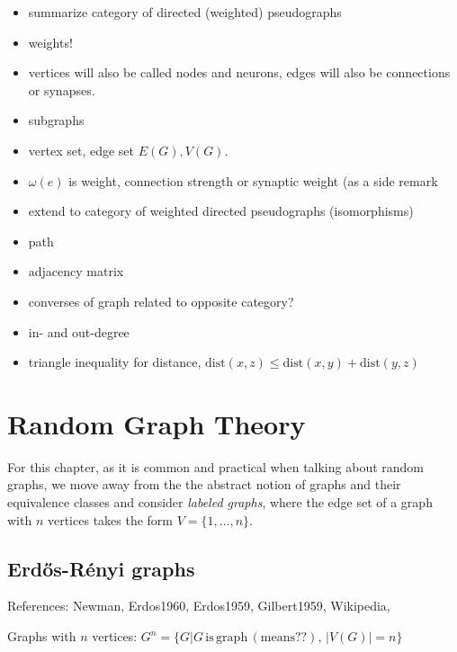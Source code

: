\begin{itemize}
\item summarize category of directed (weighted) pseudographs
\item weights!
\item vertices will also be called nodes and neurons, edges will also
  be connections or synapses.
\item subgraphs
\item vertex set, edge set $E(G), V(G)$.
\item $\omega(e)$ is weight, connection strength or synaptic weight
  (as a side remark
\item extend to category of weighted directed pseudographs
  (isomorphisms)
\item path
\item adjacency matrix
\item converses of graph related to opposite category?
\item in- and out-degree
\item triangle inequality for distance, $\mathrm{dist}(x,z) \leq
  \mathrm{dist}(x,y) + \mathrm{dist}(y,z)$
\end{itemize}

\bigskip

\section{Random Graph Theory}

For this chapter, as it is common and practical when talking about
random graphs, we move away from the the abstract notion of graphs and
their equivalence classes and consider \textit{labeled graphs}, where
the edge set of a graph with $n$ vertices takes the form $V =
\{1,\ldots,n\}$.




\subsection{Erd\H{o}s-R\'{e}nyi graphs}

References: Newman, Erdos1960, Erdos1959, Gilbert1959, 
Wikipedia, \parencite{West_Graph-theory}
		
		
\begin{defn}
  Graphs with $n$ vertices: $G^n = \{G| G\,\mathrm{is\,
    graph\,(means??)},\, |V(G)| = n\}$
\end{defn}
		
